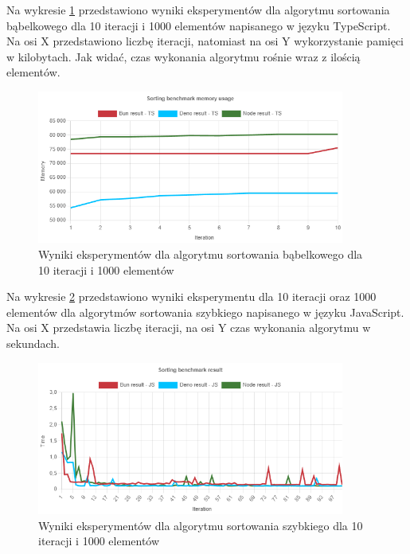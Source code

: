 Na wykresie \ref{fig:radix_sorting_e1_memory_ts} przedstawiono wyniki eksperymentów dla algorytmu sortowania bąbelkowego dla 10 iteracji i 1000 elementów napisanego w języku TypeScript. Na osi X przedstawiono liczbę iteracji, natomiast na osi Y wykorzystanie pamięci w kilobytach. Jak widać, czas wykonania algorytmu rośnie wraz z ilością elementów.
\begin{figure}[H]
  \centering
  \includegraphics[width=0.9\textwidth]{Figures/sorting/radix/e1_memory_ts.png}
  \caption{Wyniki eksperymentów dla algorytmu sortowania bąbelkowego dla 10 iteracji i 1000 elementów}
  \label{fig:radix_sorting_e1_memory_ts}
\end{figure}

Na wykresie \ref{fig:radix_sorting_e2} przedstawiono wyniki eksperymentu dla 10 iteracji oraz 1000 elementów dla algorytmów sortowania szybkiego napisanego w języku JavaScript. Na osi X przedstawia liczbę iteracji, na osi Y czas wykonania algorytmu w sekundach. 

\begin{figure}[H]
  \centering
  \includegraphics[width=0.9\textwidth]{Figures/sorting/radix/e2_js.png}
  \caption{Wyniki eksperymentów dla algorytmu sortowania szybkiego dla 10 iteracji i 1000 elementów}
  \label{fig:radix_sorting_e2}
\end{figure}

